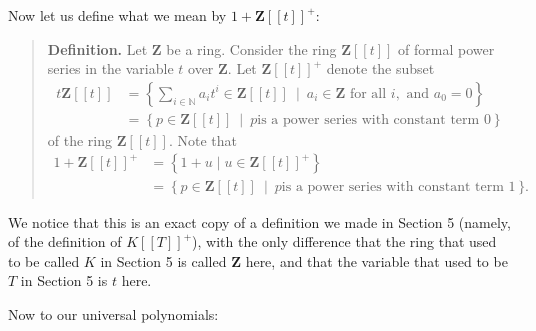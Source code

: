\documentclass[numbers=enddot,12pt,final,onecolumn,notitlepage]{scrartcl}%
\begin{document}
Now let us define what we mean by $1+\mathbf{Z}\left[  \left[  t\right]
\right]  ^{+}$:

\begin{quote}
\textbf{Definition.} Let $\mathbf{Z}$ be a ring. Consider the ring
$\mathbf{Z}\left[  \left[  t\right]  \right]  $ of formal power series in the
variable $t$ over $\mathbf{Z}$. Let $\mathbf{Z}\left[  \left[  t\right]
\right]  ^{+}$ denote the subset%
\begin{align*}
t\mathbf{Z}\left[  \left[  t\right]  \right]   &  =\left\{  \sum
_{i\in\mathbb{N}}a_{i}t^{i}\in\mathbf{Z}\left[  \left[  t\right]  \right]
\ \mid\ a_{i}\in\mathbf{Z}\text{ for all }i,\text{ and }a_{0}=0\right\} \\
&  =\left\{  p\in\mathbf{Z}\left[  \left[  t\right]  \right]  \ \mid\ p\text{
is a power series with constant term }0\right\}
\end{align*}
of the ring $\mathbf{Z}\left[  \left[  t\right]  \right]  $. Note that
\begin{align*}
1+\mathbf{Z}\left[  \left[  t\right]  \right]  ^{+}  &  =\left\{  1+u\mid
u\in\mathbf{Z}\left[  \left[  t\right]  \right]  ^{+}\right\} \\
&  =\left\{  p\in\mathbf{Z}\left[  \left[  t\right]  \right]  \ \mid\ p\text{
is a power series with constant term }1\right\}  .
\end{align*}



\end{quote}

We notice that this is an exact copy of a definition we made in Section 5
(namely, of the definition of $K\left[  \left[  T\right]  \right]  ^{+}$),
with the only difference that the ring that used to be called $K$ in Section 5
is called $\mathbf{Z}$ here, and that the variable that used to be $T$ in
Section 5 is $t$ here.

Now to our universal polynomials:
\end{document}
